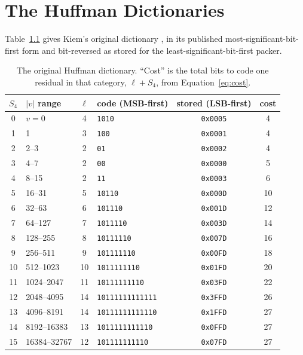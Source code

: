 \chapter{The Huffman Dictionaries}
\label{app:huffman}

Table~\ref{tab:huffman} gives Kiem's original dictionary
\cite[Table~A.1]{kiem2025}, in its published most-significant-bit-first form
and bit-reversed as stored for the least-significant-bit-first packer.

\begin{table}[h]
\centering
\caption[The original Huffman dictionary]{The original Huffman dictionary. ``Cost'' is
the total bits to code one residual in that category, $\ell + S_4$, from
Equation~\eqref{eq:cost}.}
\label{tab:huffman}
\small
\begin{tabular}{c|l|c|l|c|c}
\textbf{$S_4$} & \textbf{$|v|$ range} & \textbf{$\ell$} & \textbf{code (MSB-first)} & \textbf{stored (LSB-first)} & \textbf{cost} \\
\hline
0  & $v = 0$          & 4  & \texttt{1010}           & \texttt{0x0005} & 4 \\
1  & 1                & 3  & \texttt{100}            & \texttt{0x0001} & 4 \\
2  & 2--3             & 2  & \texttt{01}             & \texttt{0x0002} & 4 \\
3  & 4--7             & 2  & \texttt{00}             & \texttt{0x0000} & 5 \\
4  & 8--15            & 2  & \texttt{11}             & \texttt{0x0003} & 6 \\
5  & 16--31           & 5  & \texttt{10110}          & \texttt{0x000D} & 10 \\
6  & 32--63           & 6  & \texttt{101110}         & \texttt{0x001D} & 12 \\
7  & 64--127          & 7  & \texttt{1011110}        & \texttt{0x003D} & 14 \\
8  & 128--255         & 8  & \texttt{10111110}       & \texttt{0x007D} & 16 \\
9  & 256--511         & 9  & \texttt{101111110}      & \texttt{0x00FD} & 18 \\
10 & 512--1023        & 10 & \texttt{1011111110}     & \texttt{0x01FD} & 20 \\
11 & 1024--2047       & 11 & \texttt{10111111110}    & \texttt{0x03FD} & 22 \\
12 & 2048--4095       & 14 & \texttt{10111111111111} & \texttt{0x3FFD} & 26 \\
13 & 4096--8191       & 14 & \texttt{10111111111110} & \texttt{0x1FFD} & 27 \\
14 & 8192--16383      & 13 & \texttt{1011111111110}  & \texttt{0x0FFD} & 27 \\
15 & 16384--32767     & 12 & \texttt{101111111110}   & \texttt{0x07FD} & 27 \\
\end{tabular}
\end{table}


